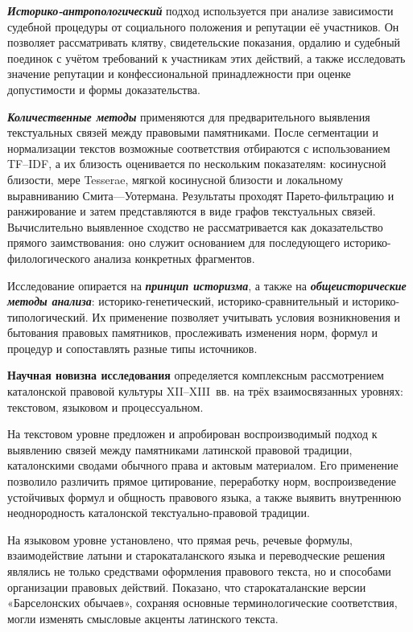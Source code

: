 \textbf{\emph{Историко-антропологический }}подход используется при анализе зависимости судебной процедуры от социального положения и репутации её участников. Он позволяет рассматривать клятву, свидетельские показания, ордалию и судебный поединок с учётом требований к участникам этих действий, а также исследовать значение репутации и конфессиональной принадлежности при оценке допустимости и формы доказательства.

\textbf{\emph{Количественные методы }}применяются для предварительного выявления текстуальных связей между правовыми памятниками. После сегментации и нормализации текстов возможные соответствия отбираются с использованием TF--IDF, а их близость оценивается по нескольким показателям: косинусной близости, мере Tesserae, мягкой косинусной близости и локальному выравниванию Смита---Уотермана. Результаты проходят Парето-фильтрацию и ранжирование и затем представляются в виде графов текстуальных связей. Вычислительно выявленное сходство не рассматривается как доказательство прямого заимствования: оно служит основанием для последующего историко-филологического анализа конкретных фрагментов.

Исследование опирается на\textbf{\emph{ принцип историзма}}, а также на \textbf{\emph{общеисторические методы анализа}}: историко-генетический, историко-сравнительный и историко-типологический. Их применение позволяет учитывать условия возникновения и бытования правовых памятников, прослеживать изменения норм, формул и процедур и сопоставлять разные типы источников.

\textbf{Научная новизна исследования} определяется комплексным рассмотрением каталонской правовой культуры XII--XIII~вв. на трёх взаимосвязанных уровнях: текстовом, языковом и процессуальном.

На текстовом уровне предложен и апробирован воспроизводимый подход к выявлению связей между памятниками латинской правовой традиции, каталонскими сводами обычного права и актовым материалом. Его применение позволило различить прямое цитирование, переработку норм, воспроизведение устойчивых формул и общность правового языка, а также выявить внутреннюю неоднородность каталонской текстуально-правовой традиции.

На языковом уровне установлено, что прямая речь, речевые формулы, взаимодействие латыни и старокаталанского языка и переводческие решения являлись не только средствами оформления правового текста, но и способами организации правовых действий. Показано, что старокаталанские версии «Барселонских обычаев», сохраняя основные терминологические соответствия, могли изменять смысловые акценты латинского текста.

